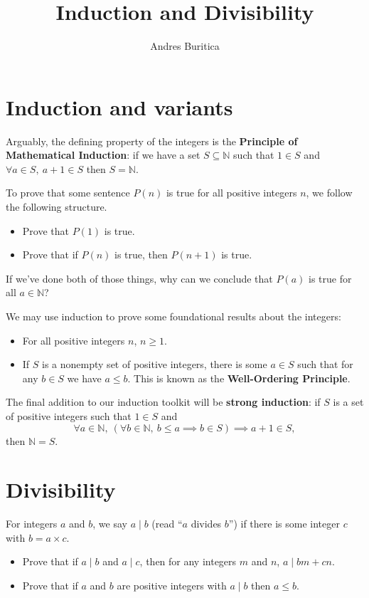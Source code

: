 \documentclass{article}
\title{Induction and Divisibility}
\author{Andres Buritica}
\date{}
\begin{document}
\maketitle
\section{Induction and variants}
  Arguably, the defining property of the integers is the \textbf{Principle of
    Mathematical Induction}: if we have a set $S\subseteq\mathbb N$ such that
    $1\in S$ and $\forall a\in S,\ a+1\in S$ then $S=\mathbb N$.
  
  To prove that some sentence $P(n)$ is true for all positive integers $n$, we
  follow the following structure.
  \begin{itemize}
    \item Prove that $P(1)$ is true.
    \item Prove that if $P(n)$ is true, then $P(n+1)$ is true.
  \end{itemize}
  If we've done both of those things, why can we conclude that $P(a)$ is true
  for all $a\in\mathbb N$?

  We may use induction to prove some foundational results about the integers:
  \begin{itemize}
    \item For all positive integers $n$, $n\ge 1$.
    \item If $S$ is a nonempty set of positive integers, there is some $a\in
      S$ such that for any $b\in S$ we have $a\le b$.
      This is known as the \textbf{Well-Ordering Principle}.
  \end{itemize}

  The final addition to our induction toolkit will be \textbf{strong induction}:
  if $S$ is a set of positive integers such that $1\in S$ and
      \[\forall a\in \mathbb N,\ (\forall b\in\mathbb N,\ b\le a\implies b\in
        S)\implies a+1\in S,\]
        then $\mathbb N=S$.
\section{Divisibility}
  For integers $a$ and $b$, we say $a\mid b$ (read ``$a$ divides
  $b$'') if there is some integer $c$ with $b=a\times c$.
  \begin{itemize}
    \item Prove that if $a\mid b$ and $a\mid c$, then for any integers $m$ and
      $n$, $a\mid bm+cn$.
    \item Prove that if $a$ and $b$ are positive integers with $a\mid b$ then
      $a\le b$.
  \end{itemize}
\end{document}
